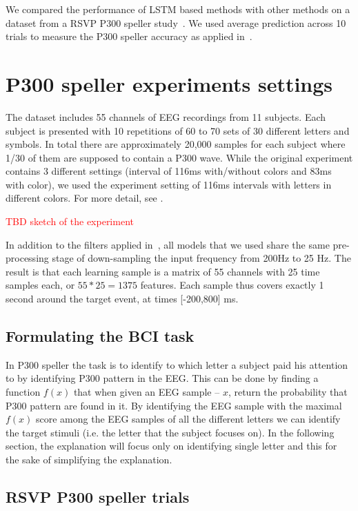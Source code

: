 \documentclass[
12pt, %
english, %
doublespacing, %
headsepline, %
]{MastersDoctoralThesis} %
\begin{document}
We compared the performance of LSTM based methods with other methods on a dataset from a RSVP P300 speller study~\cite{BlaknertzExperiment}. We used  average prediction across 10 trials to measure the P300 speller accuracy as applied in~\cite{BlaknertzExperiment}.




\section{P300 speller experiments settings}
The dataset includes 55 channels of EEG recordings from 11 subjects. Each subject is presented with 10 repetitions of 60 to 70 sets of 30 different letters and symbols. In total there are approximately 20,000 samples for each subject where 1/30 of them are supposed to contain a P300 wave. While the original experiment contains 3 different settings (interval of 116ms with/without colors and 83ms with color), we used the experiment setting of 116ms intervals with letters in different colors. For more detail, see \cite{BlaknertzExperiment}. 

\textcolor{red}{TBD sketch of the experiment}

In addition to the filters applied in~\cite{BlaknertzExperiment}, all models that we used share the same pre-processing stage of down-sampling the input frequency from 200Hz to 25 Hz. The result is that each learning sample is a matrix of 55 channels with 25 time samples each, or $55*25 = 1375$ features. Each sample thus covers exactly 1 second around the target event, at times [-200,800] ms.


\subsection{Formulating the BCI task}
In P300 speller the task is to identify to which letter a subject paid his attention to by identifying P300 pattern in the EEG. This can be done by finding a function $f(x)$ that when given an EEG sample – $x$, return the probability that P300 pattern are found in it. By identifying the EEG sample with the maximal $f(x)$ score among the EEG samples of all the different letters we can identify the target stimuli (i.e. the letter that the subject focuses on). In the following section, the explanation will focus only on identifying single letter and this for the sake of simplifying the explanation.

\subsection{RSVP P300 speller trials}
\end{document}
